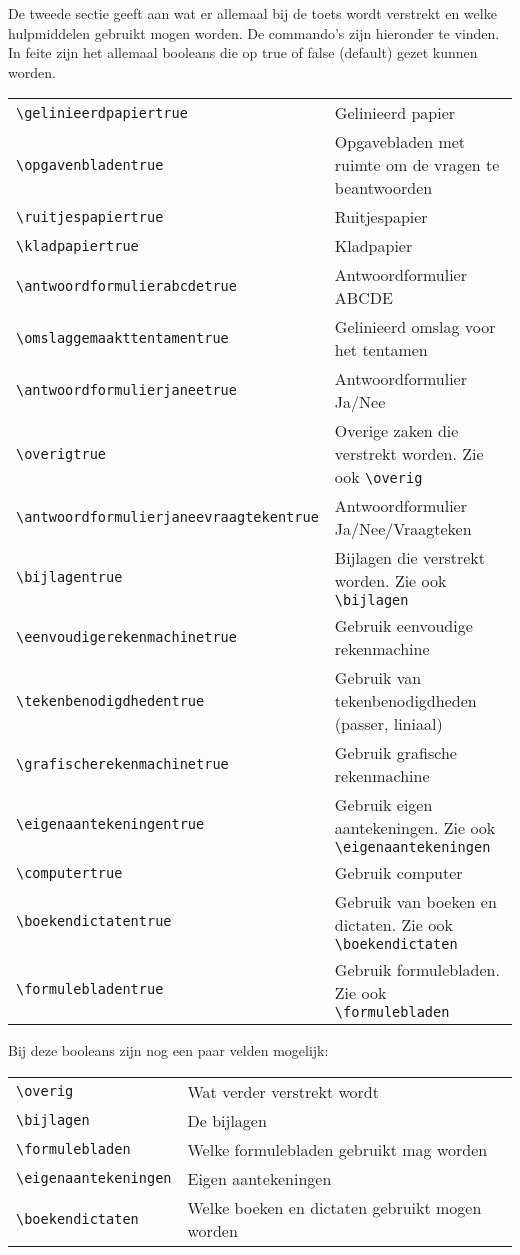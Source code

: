 \documentclass[dutch,a4paper,12pt,addpoints,fleqn,oneside]{tisdexam}
\begin{document}
De tweede sectie geeft aan wat er allemaal bij de toets wordt verstrekt en welke hulpmiddelen gebruikt
mogen worden. De commando's zijn hieronder te vinden. In feite zijn het allemaal booleans die op true
of false (default) gezet kunnen worden.

\bigskip
\begin{tabular}{lp{8cm}}
\verb|\gelinieerdpapiertrue| & Gelinieerd papier \\
\verb|\opgavenbladentrue| & Opgavebladen met ruimte om de vragen te beantwoorden \\
\verb|\ruitjespapiertrue| & Ruitjespapier \\
\verb|\kladpapiertrue| & Kladpapier \\
\verb|\antwoordformulierabcdetrue| & Antwoordformulier ABCDE \\
\verb|\omslaggemaakttentamentrue| & Gelinieerd omslag voor het tentamen \\
\verb|\antwoordformulierjaneetrue| & Antwoordformulier Ja/Nee \\
\verb|\overigtrue| & Overige zaken die verstrekt worden. Zie ook \verb|\overig| \\
\verb|\antwoordformulierjaneevraagtekentrue| & Antwoordformulier Ja/Nee/Vraagteken \\
\verb|\bijlagentrue| & Bijlagen die verstrekt worden. Zie ook \verb|\bijlagen| \\
\verb|\eenvoudigerekenmachinetrue| & Gebruik eenvoudige rekenmachine \\ 
\verb|\tekenbenodigdhedentrue| & Gebruik van tekenbenodigdheden (passer, liniaal) \\
\verb|\grafischerekenmachinetrue| & Gebruik grafische rekenmachine \\
\verb|\eigenaantekeningentrue| & Gebruik eigen aantekeningen. Zie ook \verb|\eigenaantekeningen| \\
\verb|\computertrue| & Gebruik computer \\
\verb|\boekendictatentrue| & Gebruik van boeken en dictaten. Zie ook \verb|\boekendictaten| \\
\verb|\formulebladentrue| & Gebruik formulebladen. Zie ook \verb|\formulebladen| \\
\end{tabular}

\medskip
Bij deze booleans zijn nog een paar velden mogelijk:

\bigskip
\begin{tabular}{lp{15cm}}
\verb|\overig| & Wat verder verstrekt wordt \\
\verb|\bijlagen| & De bijlagen \\
\verb|\formulebladen| & Welke formulebladen gebruikt mag worden \\
\verb|\eigenaantekeningen| & Eigen aantekeningen \\
\verb|\boekendictaten| & Welke boeken en dictaten gebruikt mogen worden \\
\end{tabular}
\end{document}
